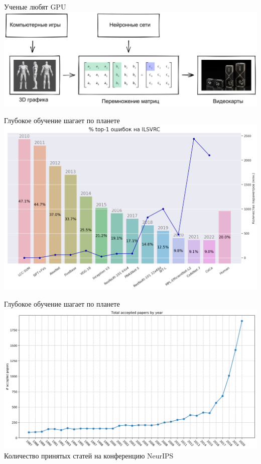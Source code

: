 \documentclass[aspectratio=169, professionalfonts]{beamer}
\begin{document}
\begin{frame}{Ученые любят GPU}
    \centering
    \includegraphics[width=\linewidth]{graphs/fig33.jpg}
\end{frame}

\begin{frame}{Глубокое обучение шагает по планете}
    \centering
    \includegraphics[width=.75\linewidth]{graphs/fig34.jpg}
\end{frame}

\begin{frame}{Глубокое обучение шагает по планете}
    \centering
    \includegraphics[width=.8\linewidth]{graphs/fig35.jpg} \\
    Количество принятых статей на конференцию NeurIPS
\end{frame}
\end{document}
